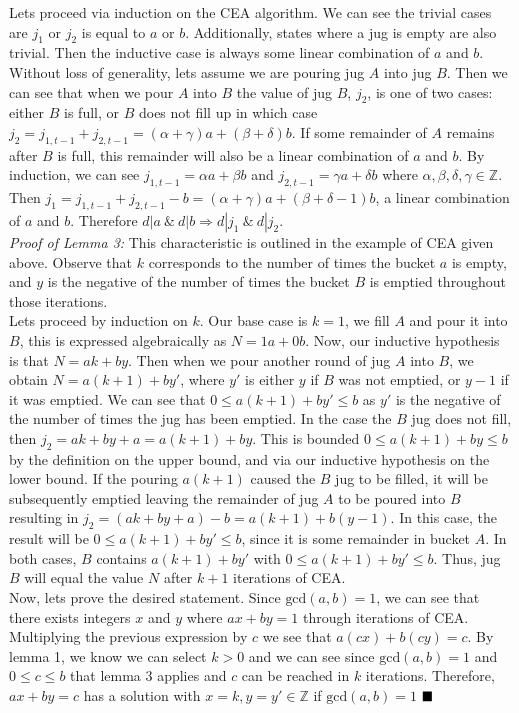 \documentclass[10pt]{article}
\newcommand{\Z}{\mathbb{Z}}
\begin{document}
\begin{enumerate}
        Lets proceed via induction on the CEA algorithm. We can see the trivial cases are $j_1$ or $j_2$ is equal to $a$ or $b$. Additionally, states where a jug is empty are also trivial. Then the inductive case is always some linear combination of $a$ and $b$. Without loss of generality, lets assume we are pouring jug $A$ into jug $B$. Then we can see that when we pour $A$ into $B$ the value of jug $B$, $j_2$, is one of two cases: either $B$ is full, or $B$ does not fill up in which case $j_2 = j_{1, t-1} + j_{2, t-1} = (\alpha + \gamma)a + (\beta + \delta)b$. If some remainder of $A$ remains after $B$ is full, this remainder will also be a linear combination of $a$ and $b$. By induction, we can see $j_{1, t-1} = \alpha a + \beta b$ and $j_{2, t-1} = \gamma a + \delta b$ where $\alpha, \beta, \delta, \gamma \in \Z$. Then $j_1 = j_{1, t-1} + j_{2, t-1} - b = (\alpha + \gamma)a + (\beta + \delta - 1)b$, a linear combination of $a$ and $b$. Therefore $d|a ~\&~ d|b \Rightarrow d|j_1 ~\&~ d|j_2$.\\

        \textit{Proof of Lemma 3:} This characteristic is outlined in the example of CEA given above. Observe that $k$ corresponds to the number of times the bucket $a$ is empty, and $y$ is the negative of the number of times the bucket $B$ is emptied throughout those iterations.\\

        Lets proceed by induction on $k$. Our base case is $k=1$, we fill $A$ and pour it into $B$, this is expressed algebraically as $N = 1a + 0b$. Now, our inductive hypothesis is that $N = ak + by$. Then when we pour another round of jug $A$ into $B$, we obtain $N = a(k+1) + by'$, where $y'$ is either $y$ if $B$ was not emptied, or $y - 1$ if it was emptied. We can see that $0 \leq a(k+1) + by' \leq b$ as $y'$ is the negative of the number of times the jug has been emptied. In the case the $B$ jug does not fill, then $j_2 = ak + by + a = a(k+1) + by$. This is bounded $0 \leq a(k+1) + by \leq b$ by the definition on the upper bound, and via our inductive hypothesis on the lower bound. If the pouring $a(k+1)$ caused the $B$ jug to be filled, it will be subsequently emptied leaving the remainder of jug $A$ to be poured into $B$ resulting in $j_2 = (ak + by + a) -b = a(k+1) +b(y-1)$. In this case, the result will be $0 \leq a(k+1) + by' \leq b$, since it is some remainder in bucket $A$. In both cases, $B$ contains $a(k+1) + by'$ with $0 \leq a(k+1) + by' \leq b$. Thus, jug $B$ will equal the value $N$ after $k + 1$ iterations of CEA.\\

        Now, lets prove the desired statement. Since $\text{gcd}(a,b) = 1$, we can see that there exists integers $x$ and $y$ where $ax + by = 1$ through iterations of CEA. Multiplying the previous expression by $c$ we see that $a(cx) + b(cy) = c$. By lemma 1, we know we can select $k > 0$ and we can see since $\text{gcd}(a,b) = 1$ and $0 \leq c \leq b$ that lemma 3 applies and $c$ can be reached in $k$ iterations. Therefore, $ax + by = c$ has a solution with $x = k,y = y' \in \Z$ if $\text{gcd}(a,b)=1$ $\hfill\blacksquare$
\end{enumerate}
	

\noindent \underline{\hspace{3in}}\\
\end{document}
